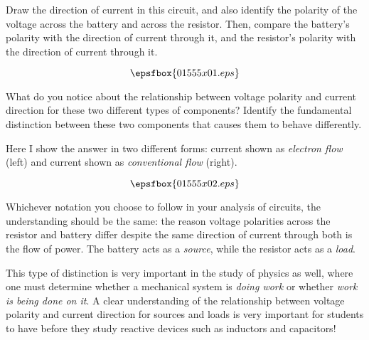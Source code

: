 

Draw the direction of current in this circuit, and also identify the polarity of the voltage across the battery and across the resistor.  Then, compare the battery's polarity with the direction of current through it, and the resistor's polarity with the direction of current through it.  

$$\epsfbox{01555x01.eps}$$

What do you notice about the relationship between voltage polarity and current direction for these two different types of components?  Identify the fundamental distinction between these two components that causes them to behave differently.







Here I show the answer in two different forms: current shown as {\it electron flow} (left) and current shown as {\it conventional flow} (right).

$$\epsfbox{01555x02.eps}$$

Whichever notation you choose to follow in your analysis of circuits, the understanding should be the same: the reason voltage polarities across the resistor and battery differ despite the same direction of current through both is the flow of power.  The battery acts as a {\it source}, while the resistor acts as a {\it load}.







This type of distinction is very important in the study of physics as well, where one must determine whether a mechanical system is {\it doing work} or whether {\it work is being done on it}.  A clear understanding of the relationship between voltage polarity and current direction for sources and loads is very important for students to have before they study reactive devices such as inductors and capacitors!




